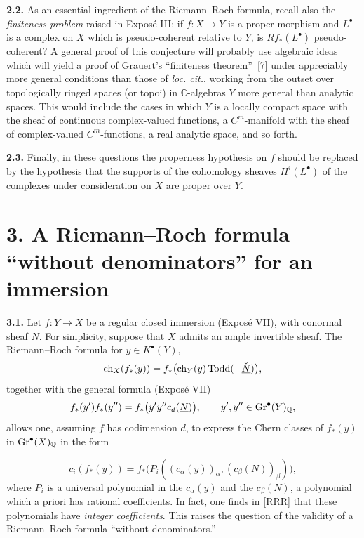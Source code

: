 \textbf{2.2.} As an essential ingredient of the Riemann--Roch formula,
recall also the \emph{finiteness problem} raised in Expos\'e III: if
$f:X\to Y$ is a proper morphism and $L^\bullet$ is a complex on $X$
which is pseudo-coherent relative to $Y$, is $Rf_*(L^\bullet)$
pseudo-coherent? A general proof of this conjecture will probably use
algebraic ideas which will yield a proof of Grauert's ``finiteness
theorem''~[7] under appreciably more general conditions than those of
\emph{loc. cit.}, working from the outset over topologically ringed
spaces (or topoi) in $\mathbb C$-algebras $Y$ more general than analytic
spaces. This would include the cases in which $Y$ is a locally compact
space with the sheaf of continuous complex-valued functions, a
$C^m$-manifold with the sheaf of complex-valued $C^m$-functions, a real
analytic space, and so forth.

\textbf{2.3.} Finally, in these questions the properness hypothesis on $f$ should be replaced by the hypothesis that the supports of the cohomology sheaves $H^i(L^\bullet)$ of the complexes under consideration on $X$ are proper over $Y$.

\section*{3. A Riemann--Roch formula ``without denominators'' for an immersion}

\textbf{3.1.} Let $f:Y\to X$ be a regular closed immersion (Expos\'e VII), with conormal sheaf $\underline N$. For simplicity, suppose that $X$ admits an ample invertible sheaf. The Riemann--Roch formula for $y\in K^\bullet(Y)$,
\[
  \operatorname{ch}_X(f_*(y))
  =f_*\bigl(\operatorname{ch}_Y(y)\operatorname{Todd}(-\check{\underline N})\bigr),
\]
together with the general formula (Expos\'e VII)
\[
  f_*(y')f_*(y'')
  =f_*\bigl(y'y''c_d(\underline N)\bigr),
  \qquad y',y''\in\operatorname{Gr}^\bullet(Y)_{\mathbb Q},
\]
allows one, assuming $f$ has codimension $d$, to express the Chern classes of $f_*(y)$ in $\operatorname{Gr}^\bullet(X)_{\mathbb Q}$ in the form

\begin{equation}\tag{3.1}
  c_i(f_*(y))
  =f_*\bigl(P_i((c_\alpha(y))_\alpha,(c_\beta(\underline N))_\beta)\bigr),
\end{equation}
where $P_i$ is a universal polynomial in the $c_\alpha(y)$ and the $c_\beta(\underline N)$, a polynomial which a priori has rational coefficients. In fact, one finds in [RRR] that these polynomials have \emph{integer coefficients}. This raises the question of the validity of a Riemann--Roch formula ``without denominators.''


